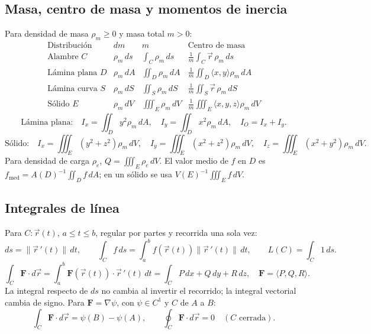 \subsection*{Masa, centro de masa y momentos de inercia}
Para densidad de masa $\rho_m\geq0$ y masa total $m>0$:
\[
\begin{array}{c|c|c|c}
\text{Distribución}&dm&m&\text{Centro de masa}\\\hline
\text{Alambre }C&\rho_m\,ds&\displaystyle\int_C\rho_m\,ds&
\displaystyle\frac1m\int_C\vec r\,\rho_m\,ds\\[5pt]
\text{Lámina plana }D&\rho_m\,dA&\displaystyle\iint_D\rho_m\,dA&
\displaystyle\frac1m\iint_D\langle x,y\rangle\rho_m\,dA\\[5pt]
\text{Lámina curva }S&\rho_m\,dS&\displaystyle\iint_S\rho_m\,dS&
\displaystyle\frac1m\iint_S\vec r\,\rho_m\,dS\\[5pt]
\text{Sólido }E&\rho_m\,dV&\displaystyle\iiint_E\rho_m\,dV&
\displaystyle\frac1m\iiint_E\langle x,y,z\rangle\rho_m\,dV
\end{array}
\]
\[
\text{Lámina plana:}\quad I_x=\iint_D y^2\rho_m\,dA,\quad
I_y=\iint_D x^2\rho_m\,dA,\quad I_O=I_x+I_y.
\]
\[
\text{Sólido:}\quad
I_x=\iiint_E(y^2+z^2)\rho_m\,dV,\quad
I_y=\iiint_E(x^2+z^2)\rho_m\,dV,\quad
I_z=\iiint_E(x^2+y^2)\rho_m\,dV.
\]
Para densidad de carga $\rho_e$, $Q=\iiint_E\rho_e\,dV$.
El valor medio de $f$ en $D$ es $\displaystyle f_{\mathrm{med}}=A(D)^{-1}\iint_D f\,dA$;
en un sólido se usa $V(E)^{-1}\iiint_E f\,dV$.

\subsection*{Integrales de línea}
Para $C:\vec r(t)$, $a\leq t\leq b$, regular por partes y recorrida una sola vez:
\[
ds=\|\vec r\,'(t)\|\,dt,\qquad
\int_C f\,ds=\int_a^b f(\vec r(t))\|\vec r\,'(t)\|\,dt,
\qquad L(C)=\int_C1\,ds.
\]
\[
\int_C\mathbf F\cdot d\vec r
=\int_a^b\mathbf F(\vec r(t))\cdot\vec r\,'(t)\,dt
=\int_C P\,dx+Q\,dy+R\,dz,
\quad\mathbf F=\langle P,Q,R\rangle.
\]
La integral respecto de $ds$ no cambia al invertir el recorrido;
la integral vectorial cambia de signo.
Para $\mathbf F=\nabla\psi$, con $\psi\in C^1$ y $C$ de $A$ a $B$:
\[
\int_C\mathbf F\cdot d\vec r=\psi(B)-\psi(A),\qquad
\oint_C\mathbf F\cdot d\vec r=0\quad(C\text{ cerrada}).
\]

